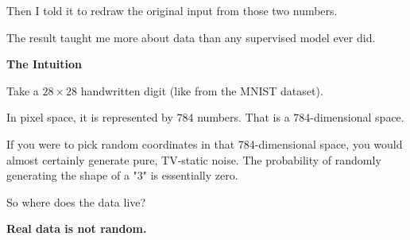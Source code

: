 \documentclass[11pt]{article}
\begin{document}
{\Large
Then I told it to redraw the original input from those two numbers.
}

\vspace{0.3in}

{\Large
The result taught me more about data than any supervised model ever did.
}

\vfill
\newpage


\vspace*{1.0in}

\begin{center}
{\fontsize{26}{30}\selectfont\color{brandnavy}\bfseries The Intuition}
\end{center}

\vspace{0.3in}

Take a $28 \times 28$ handwritten digit (like from the MNIST dataset). 

\vspace{0.2in}

In pixel space, it is represented by 784 numbers. That is a 784-dimensional space. 

\vspace{0.2in}

If you were to pick random coordinates in that 784-dimensional space, you would almost certainly generate pure, TV-static noise. The probability of randomly generating the shape of a "3" is essentially zero.

\vspace{0.2in}

So where does the data live?

\vspace{0.6in}

\begin{tcolorbox}[
    colback=brandlight,
    colframe=brandblue,
    arc=5pt,
    boxrule=0.8pt,
    left=15pt, right=15pt, top=15pt, bottom=15pt
]
\Large\color{brandnavy}\textbf{Real data is not random.}
\end{tcolorbox}

\newpage


\vspace*{0.8in}
\end{document}
